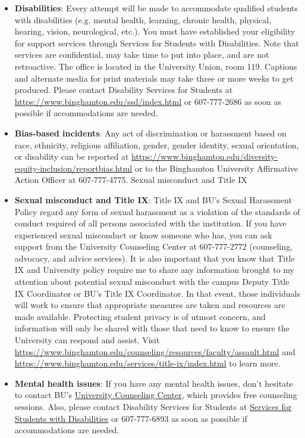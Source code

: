 \documentclass[11pt, a4paper]{article}
\begin{document}
\begin{itemize}
    \item \textbf{Disabilities}: Every attempt will be made to accommodate qualified students with disabilities (e.g. mental health, learning, chronic health, physical, hearing, vision, neurological, etc.). You must have established your eligibility for support services through Services for Students with Disabilities. Note that services are confidential, may take time to put into place, and are not retroactive. The office is located in the University Union, room 119. Captions and alternate media for print materials may take three or more weeks to get produced. Please contact Disability Services for Students at \url{https://www.binghamton.edu/ssd/index.html} or 607-777-2686 as soon as possible if accommodations are needed.
    \item \textbf{Bias-based incidents}: Any act of discrimination or harassment based on race, ethnicity, religious affiliation, gender, gender identity, sexual orientation, or disability can be reported at \url{https://www.binghamton.edu/diversity-equity-inclusion/reportbias.html} or to the Binghamton University Affirmative Action Officer at 607-777-4775.
    Sexual misconduct and Title IX
    \item \textbf{Sexual misconduct and Title IX}: Title IX and BU’s Sexual Harassment Policy regard any form of sexual harassment as a violation of the standards of conduct required of all persons associated with the institution. If you have experienced sexual misconduct or know someone who has, you can ask support from the University Counseling Center at 607-777-2772 (counseling, advocacy, and advice services). It is also important that you know that Title IX and University policy require me to share any information brought to my attention about potential sexual misconduct with the campus Deputy Title IX Coordinator or BU’s Title IX Coordinator. In that event, those individuals will work to ensure that appropriate measures are taken and resources are made available. Protecting student privacy is of utmost concern, and information will only be shared with those that need to know to ensure the University can respond and assist. Visit \url{https://www.binghamton.edu/counseling/resources/faculty/assault.html} and \url{https://www.binghamton.edu/services/title-ix/index.html} to learn more.
    \item \textbf{Mental health issues}: If you have any mental health issues, don’t hesitate to contact BU’s \href{https://www.binghamton.edu/counseling/index.html}{University Counseling Center}, which provides free counseling sessions. Also, please contact Disability Services for Students at \href{https://www.binghamton.edu/ssd/index.html}{Services for Students with Disabilities} or 607-777-6893 as soon as possible if accommodations are needed.

\end{itemize}
\end{document}
